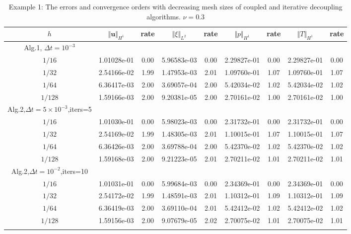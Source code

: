 \documentclass{article}
\numberwithin{equation}{section}
\begin{document}
\begin{table}[htbp] \tiny  
\caption{Example 1: The errors and convergence orders with decreasing mesh sizes of
 coupled and iterative decoupling algorithms. $ \nu=0.3$ }
\centering
\begin{tabular}{ccccccccc}
\toprule
  $h$&$\Vert\bm u\Vert_{H^1}$ &rate &$\Vert\xi\Vert_{L^2}$ &rate &$\Vert p\Vert_{H^1}$ &rate&$\Vert T\Vert_{H^1}$ &rate \\ 
\midrule
Alg.1, $\Delta t=10^{-3}$ &\\
\midrule
$1/16$ & 1.01028e-01 & 0.00 & 5.96583e-03 & 0.00 & 2.29827e-01 & 0.00 & 2.29827e-01 & 0.00 \\
$1/32$ & 2.54166e-02 & 1.99 & 1.47953e-03 & 2.01 & 1.09760e-01 & 1.07 & 1.09760e-01 & 1.07 \\
$1/64$ & 6.36417e-03 & 2.00 & 3.69057e-04 & 2.00 & 5.42034e-02 & 1.02 & 5.42034e-02 & 1.02 \\
$1/128$ & 1.59166e-03 & 2.00 & 9.20381e-05 & 2.00 & 2.70161e-02 & 1.00 & 2.70161e-02 & 1.00 \\
\midrule
Alg.2,$\Delta t=5\times 10^{-3}$,iters=5 &\\
\midrule
$1/16$ & 1.01030e-01 & 0.00 & 5.98023e-03 & 0.00 & 2.31732e-01 & 0.00 & 2.31732e-01 & 0.00 \\
$1/32$ & 2.54169e-02 & 1.99 & 1.48305e-03 & 2.01 & 1.10015e-01 & 1.07 & 1.10015e-01 & 1.07 \\
$1/64$ & 6.36426e-03 & 2.00 & 3.69788e-04 & 2.00 & 5.42370e-02 & 1.02 & 5.42370e-02 & 1.02 \\
$1/128$ & 1.59168e-03 & 2.00 & 9.21223e-05 & 2.01 & 2.70211e-02 & 1.01 & 2.70211e-02 & 1.01 \\
\midrule
Alg.2,$\Delta t=10^{-2}$,iters=10 &\\
\midrule
$1/16$ & 1.01031e-01 & 0.00 & 5.99684e-03 & 0.00 & 2.34369e-01 & 0.00 & 2.34369e-01 & 0.00 \\
$1/32$ & 2.54172e-02 & 1.99 & 1.48591e-03 & 2.01 & 1.10312e-01 & 1.09 & 1.10312e-01 & 1.09 \\
$1/64$ & 6.36419e-03 & 2.00 & 3.69110e-04 & 2.01 & 5.42412e-02 & 1.02 & 5.42412e-02 & 1.02 \\
$1/128$ & 1.59156e-03 & 2.00 & 9.07679e-05 & 2.02 & 2.70075e-02 & 1.01 & 2.70075e-02 & 1.01 \\
\bottomrule
\label{tab:K Theta 0.1 nu 0.3}
\end{tabular}
\end{table} 
\end{document}
